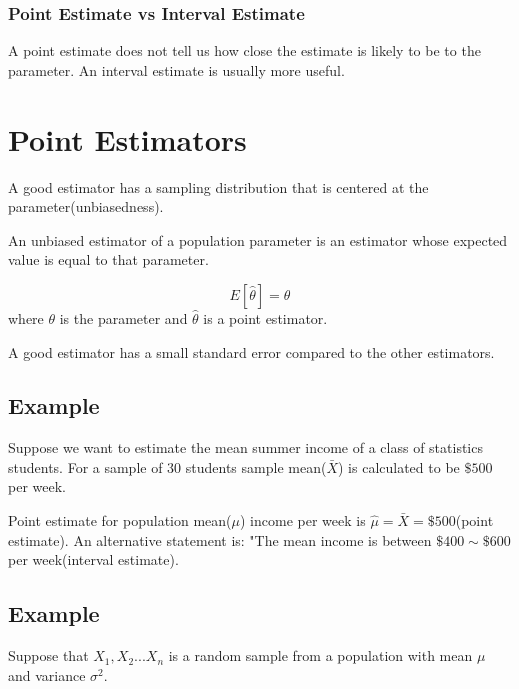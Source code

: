 \documentclass{article}
\begin{document}
        \subsubsection*{Point Estimate vs Interval Estimate}
        A point estimate does not tell us how close the estimate is likely to be to the parameter.
        An interval estimate is usually more useful. 

    \section*{Point Estimators}
    A good estimator has a sampling distribution that
    is centered at the parameter(unbiasedness).\par

    An unbiased estimator of a population parameter is an estimator
    whose expected value is equal to that parameter.\par

    \begin{equation*}
        E[\hat{\theta}] = \theta
    \end{equation*}
    where $\theta$ is the parameter and $\hat{\theta}$ is a point estimator.\par

    A good estimator has a small standard error compared to the other estimators.\par

    \subsection*{Example}
    Suppose we want to estimate the mean summer income of a class of statistics students.
    For a sample of 30 students sample mean($\bar{X}$) is calculated to be $\$500$ per week.\par

    Point estimate for population mean($\mu$) income per week is $\hat{\mu} = \bar{X} = \$500$(point estimate).
    An alternative statement is: "The mean income is between $\$400 \sim \$600$ per week(interval estimate).

    \subsection*{Example}
    Suppose that $X_{1} , X_{2}... X_{n}$ is a random sample from a population with mean $\mu$
    and variance $\sigma^{2}$.\par
   
\end{document}
